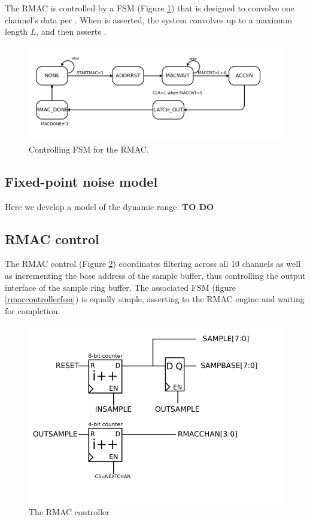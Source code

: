 The RMAC is controlled by a FSM (Figure \ref{rmacfsm}) that is designed to convolve one channel's data per . When  is asserted, the system convolves up to a maximum length $L$, and then asserts . 

\begin{figure}
\label{rmacfsm}
\includegraphics[scale=1.0]{RMAC_fsm.svg}
\caption{Controlling FSM for the RMAC.}
\end{figure}


\subsection{Fixed-point noise model} 
Here we develop a model of the dynamic range. \textbf{TO DO } 

\subsection{RMAC control}
The RMAC control (Figure \ref{rmaccontroller}) coordinates filtering
across all 10 channels as well as incrementing the base address of the
sample buffer, thus controlling the output interface of the sample
ring buffer. The associated FSM (figure \ref{rmaccontrollerfsm}) is
equally simple, asserting  to the RMAC engine and
waiting for completion.

\begin{figure}
\label{rmaccontroller}
\includegraphics[scale=1.0]{RMACcontrol.svg}
\caption{The RMAC controller}
\end{figure}

